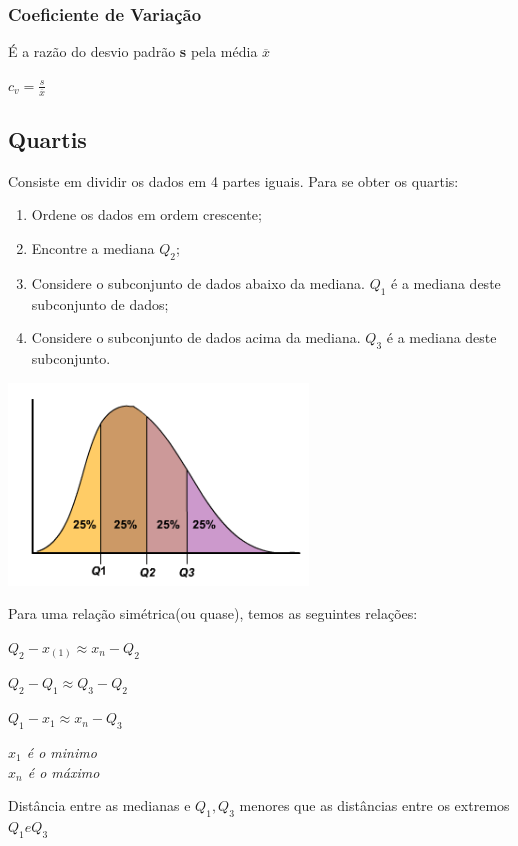 \documentclass[a4paper, 12pt]{article}
\begin{document}
\subsubsection{Coeficiente de Variação}
	É a razão do desvio padrão \textbf{s} pela média $\overline{x}$
	\begin{center}
		\LARGE
		$
		c_{v} = \frac{s}{\overline{x}}
		$
	\end{center}

\subsection{Quartis}
	Consiste em dividir os dados em 4 partes iguais.
	Para se obter os quartis:
	\begin{enumerate}
		\item Ordene os dados em ordem crescente;
		\item Encontre a mediana $Q_{2}$;
		\item Considere o subconjunto de dados abaixo da mediana. $Q_{1}$ é a mediana deste subconjunto de dados;
		\item Considere o subconjunto de dados acima da mediana. $Q_{3}$ é a mediana deste subconjunto.
	\end{enumerate}
	\begin{center}
		\includegraphics[width=0.5\linewidth]{imagens/quartis.png}
	\end{center}
	Para uma relação simétrica(ou quase), temos as seguintes relações:
	\begin{center}
		$Q_{2} - x_{(1)} \approx x_{n} - Q_{2}$
		
		$Q_{2} - Q_{1} \approx Q_{3}-Q_{2}$
		
		$Q_{1} - x_{1} \approx x_{n}-Q_{3}$
	\end{center}
	\begin{flushright}
		\textit{$x_{1}$ é o minimo\\
		$x_{n}$ é o máximo}
	\end{flushright}
	Distância entre as medianas e $Q_{1}, Q_{3}$ menores que as distâncias entre os extremos $Q_{1} e Q_{3}$
\end{document}
